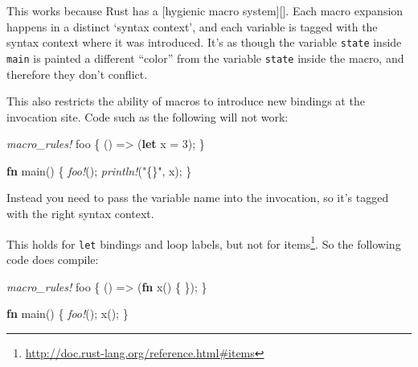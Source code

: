 \documentclass[a4paper,]{book}
\newenvironment{Shaded}{\begin{snugshade}}{\end{snugshade}}
\newcommand{\KeywordTok}[1]{\textcolor[rgb]{0.13,0.29,0.53}{\textbf{{#1}}}}
\newcommand{\DecValTok}[1]{\textcolor[rgb]{0.00,0.00,0.81}{{#1}}}
\newcommand{\StringTok}[1]{\textcolor[rgb]{0.31,0.60,0.02}{{#1}}}
\newcommand{\PreprocessorTok}[1]{\textcolor[rgb]{0.56,0.35,0.01}{\textit{{#1}}}}
\newcommand{\NormalTok}[1]{{#1}}
\renewcommand{\href}[2]{#2\footnote{\url{#1}}}
\begin{document}
This works because Rust has a {[}hygienic macro system{]}{[}{]}. Each
macro expansion happens in a distinct `syntax context', and each
variable is tagged with the syntax context where it was introduced. It's
as though the variable \texttt{state} inside \texttt{main} is painted a
different ``color'' from the variable \texttt{state} inside the macro,
and therefore they don't conflict.

This also restricts the ability of macros to introduce new bindings at
the invocation site. Code such as the following will not work:

\begin{Shaded}
\begin{Highlighting}[]
\PreprocessorTok{macro_rules!} \NormalTok{foo \{}
    \NormalTok{() => (}\KeywordTok{let} \NormalTok{x = }\DecValTok{3}\NormalTok{);}
\NormalTok{\}}

\KeywordTok{fn} \NormalTok{main() \{}
    \PreprocessorTok{foo!}\NormalTok{();}
    \PreprocessorTok{println!}\NormalTok{(}\StringTok{"\{\}"}\NormalTok{, x);}
\NormalTok{\}}
\end{Highlighting}
\end{Shaded}

Instead you need to pass the variable name into the invocation, so it's
tagged with the right syntax context.

\begin{Shaded}
\end{Shaded}

This holds for \texttt{let} bindings and loop labels, but not for
\href{http://doc.rust-lang.org/reference.html\#items}{items}. So the
following code does compile:

\begin{Shaded}
\begin{Highlighting}[]
\PreprocessorTok{macro_rules!} \NormalTok{foo \{}
    \NormalTok{() => (}\KeywordTok{fn} \NormalTok{x() \{ \});}
\NormalTok{\}}

\KeywordTok{fn} \NormalTok{main() \{}
    \PreprocessorTok{foo!}\NormalTok{();}
    \NormalTok{x();}
\NormalTok{\}}
\end{Highlighting}
\end{Shaded}
\end{document}
